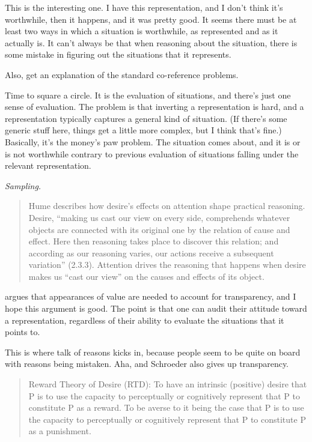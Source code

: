 \documentclass[10pt]{article}
\begin{document}
This is the interesting one.
I have this representation, and I don't think it's worthwhile, then it happens, and it was pretty good.
It seems there must be at least two ways in which a situation is worthwhile, as represented and as it actually is.
It can't always be that when reasoning about the situation, there is some mistake in figuring out the situations that it represents.

Also, get an explanation of the standard co-reference problems.

Time to square a circle.
It is the evaluation of situations, and there's just one sense of evaluation.
The problem is that inverting a representation is hard, and a representation typically captures a general kind of situation.
(If there's some generic stuff here, things get a little more complex, but I think that's fine.)
Basically, it's the money's paw problem.
The situation comes about, and it is or is not worthwhile contrary to previous evaluation of situations falling under the relevant representation.

\emph{Sampling.}





\begin{quote}
  Hume describes how desire's effects on attention shape practical reasoning. Desire, ``making us cast our view on every side, comprehends whatever objects are connected with its original one by the relation of cause and effect. Here then reasoning takes place to discover this relation; and according as our reasoning varies, our actions receive a subsequent variation'' (2.3.3).
  Attention drives the reasoning that happens when desire makes us ``cast our view'' on the causes and effects of its object.
  \textcite[35]{Sinhababu:2017aa}
\end{quote}

\citeauthor{Ashwell:2013aa} argues that appearances of value are needed to account for transparency, and I hope this argument is good.
The point is that one can audit their attitude toward a representation, regardless of their ability to evaluate the situations that it points to.

This is where talk of reasons kicks in, because people seem to be quite on board with reasons being mistaken.
Aha, and Schroeder also gives up transparency.


\begin{quote}
  Reward Theory of Desire (RTD): To have an intrinsic (positive) desire that P is to use the capacity to perceptually or cognitively represent that P to constitute P as a reward.
  To be averse to it being the case that P is to use the capacity to perceptually or cognitively represent that P to constitute P as a punishment.\nolinebreak
  \mbox{ }\hfill\citeauthor[131]{Schroeder:2004aa}
\end{quote}
\end{document}
